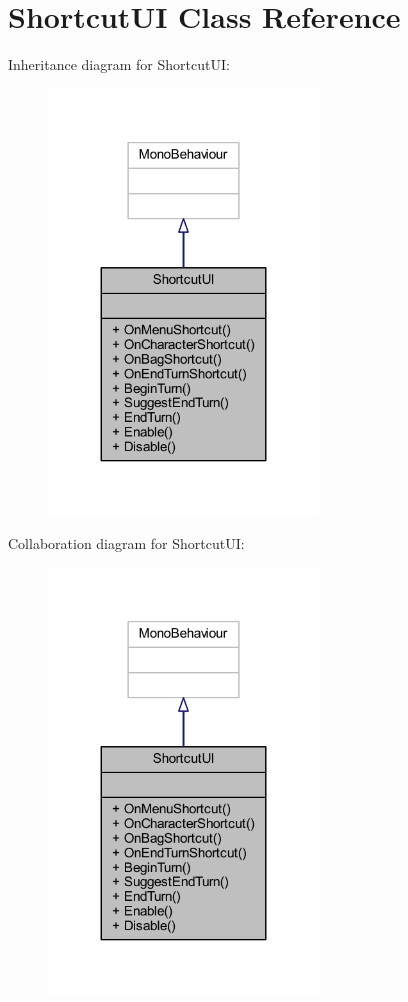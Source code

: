 \hypertarget{class_shortcut_u_i}{}\section{Shortcut\+UI Class Reference}
\label{class_shortcut_u_i}


Inheritance diagram for Shortcut\+UI\+:
\nopagebreak
\begin{figure}[H]
\begin{center}
\leavevmode
\includegraphics[width=203pt]{class_shortcut_u_i__inherit__graph}
\end{center}
\end{figure}


Collaboration diagram for Shortcut\+UI\+:
\nopagebreak
\begin{figure}[H]
\begin{center}
\leavevmode
\includegraphics[width=203pt]{class_shortcut_u_i__coll__graph}
\end{center}
\end{figure}

